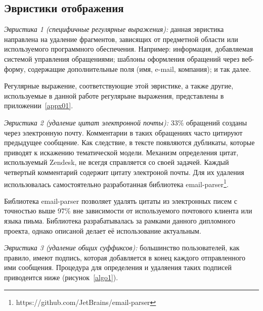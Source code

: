 \subsection{Эвристики отображения}
\label{subsec:lnfheur}

\textit{Эвристика 1 (специфичные регулярные выражения): }  данная эвристика направлена на удаление фрагментов, зависящих от предметной области или используемого программного обеспечения. Например: информация, добавляемая системой управления обращениями; шаблоны оформления обращений через веб-форму, содержащие дополнительные поля (имя, e-mail, компания); и так далее. 

Регулярные выражение, соответствующие этой эвристике, а также другие, используемые в данной работе регулярыне выражения, представлены в приложении~\ref{appx01}.

\textit{Эвристика 2 (удаление цитат электронной почты):} 33\% обращений созданы через электронную почту. Комментарии в таких обращениях часто цитируют предыдущее сообщение. Как следствие, в тексте появляются дубликаты, которые приводят к искажению тематической модели. Механизм определения цитат, используемый Zendesk, не всегдя справляется со своей задачей. Каждый четвертый комментарий содержит цитату электроной почты. Для их удаления использовалась самостоятельно разработанная библиотека email-parser\footnote{https://github.com/JetBrains/email-parser}.

Библиотека email-parser позволяет удалять цитаты из электронных писем с точностью выше 97\% вне зависимости от используемого почтового клиента или языка пиьма. Библиотека разрабатывалась за рамками данного дипломного проекта, однако описаной делает её использование актуальным.

\textit{Эвристика 3 (удаление общих суффиксов):} большинство пользователей, как правило, имеют подпись, которая добавляется в конец каждого отправленного ими сообщения. Процедура для определения и удаляения таких подписей приводеится ниже (рисунок~\ref{algo1}).

